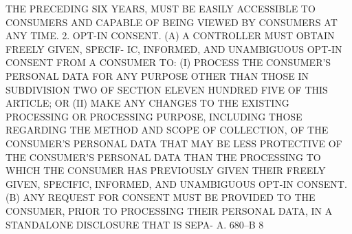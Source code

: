  THE PRECEDING SIX YEARS,   MUST BE EASILY ACCESSIBLE  TO  CONSUMERS  AND
 CAPABLE OF BEING VIEWED BY CONSUMERS AT ANY TIME.
   2. OPT-IN CONSENT.  (A) A CONTROLLER MUST OBTAIN FREELY GIVEN, SPECIF-
 IC, INFORMED, AND UNAMBIGUOUS OPT-IN CONSENT FROM A CONSUMER TO:
   (I)  PROCESS  THE  CONSUMER'S PERSONAL DATA FOR ANY PURPOSE OTHER THAN
 THOSE IN SUBDIVISION TWO OF SECTION ELEVEN HUNDRED FIVE OF THIS ARTICLE;
 OR
   (II) MAKE  ANY  CHANGES  TO  THE  EXISTING  PROCESSING  OR  PROCESSING
 PURPOSE,  INCLUDING  THOSE REGARDING THE METHOD AND SCOPE OF COLLECTION,
 OF THE CONSUMER'S PERSONAL DATA THAT  MAY  BE  LESS  PROTECTIVE  OF  THE
 CONSUMER'S  PERSONAL  DATA THAN THE PROCESSING TO WHICH THE CONSUMER HAS
 PREVIOUSLY GIVEN THEIR FREELY GIVEN, SPECIFIC, INFORMED, AND UNAMBIGUOUS
 OPT-IN CONSENT.
   (B) ANY REQUEST FOR CONSENT MUST BE PROVIDED TO THE CONSUMER, PRIOR TO
 PROCESSING THEIR PERSONAL DATA, IN A STANDALONE DISCLOSURE THAT IS SEPA-
 A. 680--B                           8
 
